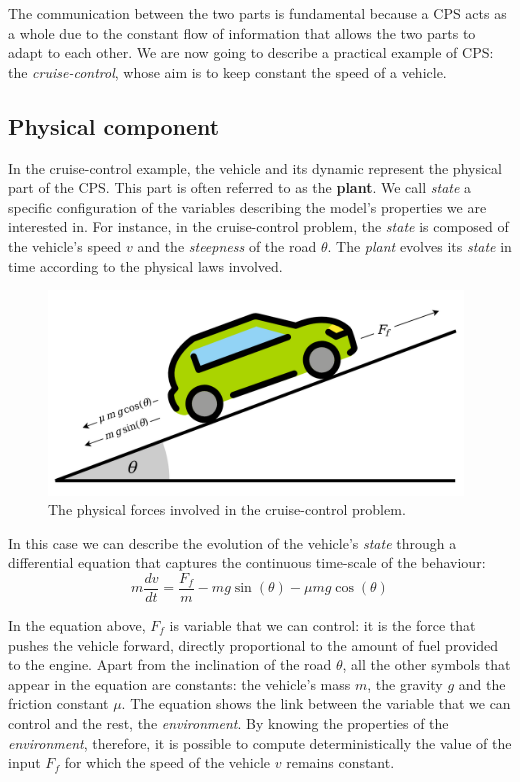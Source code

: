 The communication between the two parts is fundamental because a CPS acts as a whole due to the constant flow of information that allows the two parts to adapt to each other.
We are now going to describe a practical example of CPS: the \textit{cruise-control}, whose aim is to keep constant the speed of a vehicle.

\subsection{Physical component}
In the cruise-control example, the vehicle and its dynamic represent the physical part of the CPS.
This part is often referred to as the \textbf{plant}.
We call \textit{state} a specific configuration of the variables describing the model's properties we are interested in.
For instance, in the cruise-control problem, the \textit{state} is composed of the vehicle's speed $v$ and the \textit{steepness} of the road $\theta$.
The \textit{plant} evolves its \textit{state} in time according to the physical laws involved.

\begin{figure}[H]
	\centering
	\includegraphics[width=11cm, keepaspectratio]{img/2_1_car_physics.png}
	\caption{The physical forces involved in the cruise-control problem.}
\end{figure}

In this case we can describe the evolution of the vehicle's \textit{state} through a differential equation that captures the continuous time-scale of the behaviour:
$$ m\frac{dv}{dt} = \frac{F_f}{m} - mg \sin(\theta) - \mu mg \cos(\theta) $$

In the equation above, $F_f$ is variable that we can control: it is the force that pushes the vehicle forward, directly proportional to the amount of fuel provided to the engine.
Apart from the inclination of the road $\theta$, all the other symbols that appear in the equation are constants: the vehicle's mass $m$, the gravity $g$ and the friction constant $\mu$.
The equation shows the link between the variable that we can control and the rest, the \textit{environment}.
By knowing the properties of the \textit{environment}, therefore, it is possible to compute deterministically the value of the input $F_f$ for which the speed of the vehicle $v$ remains constant.


